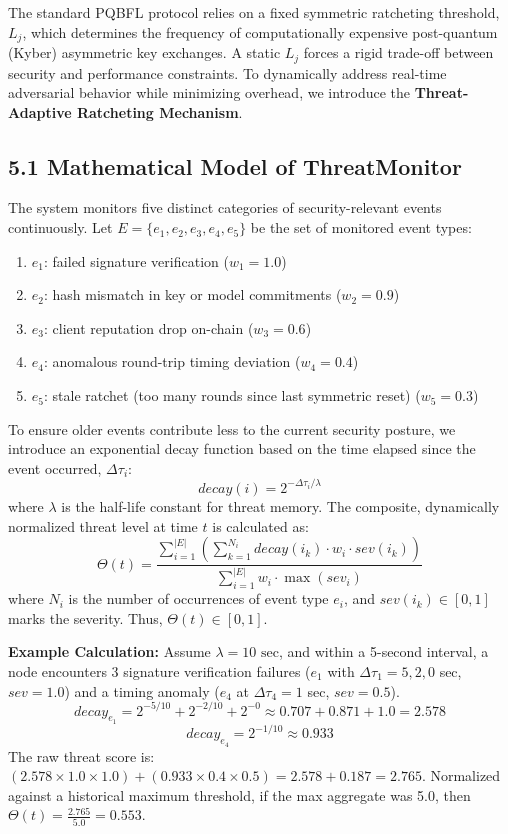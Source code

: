 \documentclass[12pt]{article}
\begin{document}
The standard PQBFL protocol relies on a fixed symmetric ratcheting threshold, $L_j$, which determines the frequency of computationally expensive post-quantum (Kyber) asymmetric key exchanges. A static $L_j$ forces a rigid trade-off between security and performance constraints. To dynamically address real-time adversarial behavior while minimizing overhead, we introduce the \textbf{Threat-Adaptive Ratcheting Mechanism}.

\subsection*{5.1 Mathematical Model of ThreatMonitor}

The system monitors five distinct categories of security-relevant events continuously. Let $E = \{e_1, e_2, e_3, e_4, e_5\}$ be the set of monitored event types:
\begin{enumerate}
    \item $e_1$: failed signature verification ($w_1 = 1.0$)
    \item $e_2$: hash mismatch in key or model commitments ($w_2 = 0.9$)
    \item $e_3$: client reputation drop on-chain ($w_3 = 0.6$)
    \item $e_4$: anomalous round-trip timing deviation ($w_4 = 0.4$)
    \item $e_5$: stale ratchet (too many rounds since last symmetric reset) ($w_5 = 0.3$)
\end{enumerate}

To ensure older events contribute less to the current security posture, we introduce an exponential decay function based on the time elapsed since the event occurred, $\Delta \tau_i$:
\[
decay(i) = 2^{-\Delta \tau_i / \lambda}
\]
where $\lambda$ is the half-life constant for threat memory. The composite, dynamically normalized threat level at time $t$ is calculated as:
\[
\Theta(t) = \frac{\sum_{i=1}^{|E|} \left( \sum_{k=1}^{N_i} decay(i_k) \cdot w_i \cdot sev(i_k) \right)}{\sum_{i=1}^{|E|} w_i \cdot \max(sev_i)}
\]
where $N_i$ is the number of occurrences of event type $e_i$, and $sev(i_k) \in [0, 1]$ marks the severity. Thus, $\Theta(t) \in [0, 1]$.

\textbf{Example Calculation:}
Assume $\lambda = 10 \text{ sec}$, and within a 5-second interval, a node encounters 3 signature verification failures ($e_1$ with $\Delta \tau_1 = 5, 2, 0$ sec, $sev = 1.0$) and a timing anomaly ($e_4$ at $\Delta \tau_4 = 1$ sec, $sev = 0.5$). 
\[
decay_{e_1} = 2^{-5/10} + 2^{-2/10} + 2^{-0} \approx 0.707 + 0.871 + 1.0 = 2.578
\]
\[
decay_{e_4} = 2^{-1/10} \approx 0.933
\]
The raw threat score is: $(2.578 \times 1.0 \times 1.0) + (0.933 \times 0.4 \times 0.5) = 2.578 + 0.187 = 2.765$. Normalized against a historical maximum threshold, if the max aggregate was 5.0, then $\Theta(t) = \frac{2.765}{5.0} = 0.553$.
\end{document}
